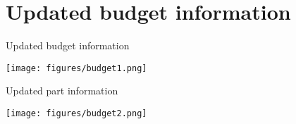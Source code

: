 \section{Updated budget information}
\begin{table}[h]
\caption{Updated budget information}
\label{tab:1}
\begin{center}
\texttt{[image: figures/budget1.png]}
\end{center}
\end{table}
\begin{table}[h]
\caption{Updated part information}
\label{tab:2}
\begin{center}
\texttt{[image: figures/budget2.png]}
\end{center}
\end{table}
